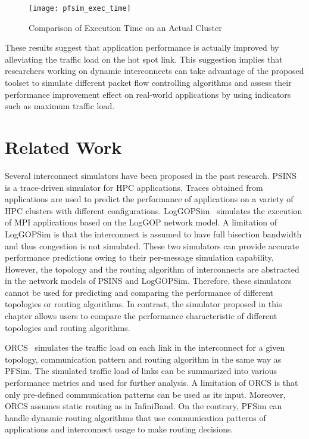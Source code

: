 \begin{figure}
    \centering
    \texttt{[image: pfsim\_exec\_time]}
    \caption{Comparison of Execution Time on an Actual Cluster}%
    \label{fig:cg-nersc-time}
\end{figure}

These results suggest that application performance is actually improved
by alleviating the traffic load on the hot spot link. This suggestion
implies that researchers working on dynamic interconnects can take advantage
of the proposed toolset to simulate different packet flow controlling
algorithms and assess their performance improvement effect on real-world
applications by using indicators such as maximum traffic load.

\section{Related Work}\label{sec:ii-related-work}

Several interconnect simulators have been proposed in the past research.
PSINS~\autocite{Tikir2009} is a trace-driven simulator for HPC
applications. Traces obtained from applications are used to predict the
performance of applications on a variety of HPC clusters with different
configurations. LogGOPSim~\autocite{Hoefler2010} simulates the execution
of MPI applications based on the LogGOP network model. A limitation of
LogGOPSim is that the interconnect is assumed to have full bisection bandwidth
and thus congestion is not simulated. These two simulators can provide
accurate performance predictions owing to their per-message simulation
capability. However, the topology and the routing algorithm of interconnects
are abstracted in the network models of PSINS and LogGOPSim. Therefore, these
simulators cannot be used for predicting and comparing the performance of
different topologies or routing algorithms. In contrast, the simulator
proposed in this chapter allows users to compare the performance
characteristic of different topologies and routing algorithms.

ORCS~\autocite{Schneider2009} simulates the traffic load on each link in
the interconnect for a given topology, communication pattern and routing
algorithm in the same way as PFSim. The simulated traffic load of links can be
summarized into various performance metrics and used for further analysis. A
limitation of ORCS is that only pre-defined communication patterns can be used
as its input. Moreover, ORCS assumes static routing as in InfiniBand. On the
contrary, PFSim can handle dynamic routing algorithms that use communication
patterns of applications and interconnect usage to make routing decisions.


